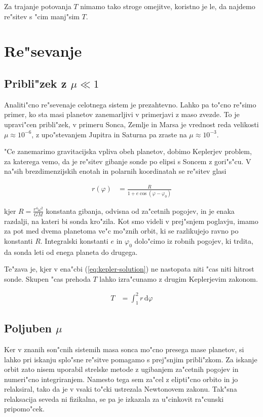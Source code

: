 \documentclass[a4paper,10pt]{article}
\renewcommand{\phi}{\varphi}
\newcommand{\dd}{\,\mathrm{d}}
\begin{document}
Za trajanje potovanja $T$ nimamo tako stroge omejitve, koristno je le, da najdemo re"sitev s "cim manj"sim $T$. 

\section{Re"sevanje}

\subsection{Pribli"zek z $\mu \ll 1$}

Analiti"cno re"sevenaje celotnega sistem je prezahtevno. Lahko pa to"cno re"simo primer, ko sta masi planetov zanemarljivi v primerjavi z maso zvezde. To je upravi"cen pribli"zek, v primeru Sonca, Zemlje in Marsa je vrednost reda velikosti $\mu \approx 10^{-6}$, z upo"stevanjem Jupitra in Saturna pa zraste na $\mu \approx 10^{-3}$. 

"Ce zanemarimo gravitacijska vpliva obeh planetov, dobimo Keplerjev problem, za katerega vemo, da je re"sitev gibanje sonde po elipsi s Soncem z gori"s"cu. V na"sih brezdimenzijskih enotah in polarnih koordinatah se re"sitev glasi

\begin{align}
\label{eq:kepler-solution}
 r(\phi) &= \frac{R}{1 + e\cos (\phi - \phi_0)}
\end{align}

kjer $R = \frac{r^4\omega^2}{GM}$ konstanta gibanja, odvisna od za"cetnih pogojev, in je enaka razdalji, na kateri bi sonda kro"zila. Kot smo videli v prej"snjem poglavju, imamo za pot med dvema planetoma ve"c mo"znih orbit, ki se razlikujejo ravno po konstanti $R$. Integralski konstanti $e$ in $\phi_0$ dolo"cimo iz robnih pogojev, ki trdita, da sonda leti od enega planeta do drugega.

Te"zava je, kjer v ena"cbi (\ref{eq:kepler-solution}) ne nastopata niti "cas niti hitrost sonde. Skupen "cas prehoda $T$ lahko izra"cunamo z drugim Keplerjevim zakonom. 

\begin{align}
 T &= \int_1^2 r \dd \phi
\end{align}

\subsection{Poljuben $\mu$}

Ker v znanih son"cnih sistemih masa sonca mo"cno presega mase planetov, si lahko pri iskanju splo"sne re"sitve pomagamo s prej"snjim pribli"zkom. Za iskanje orbit zato nisem uporabil strelske metode z ugibanjem za"cetnih pogojev in numeri"cno integriranjem. Namesto tega sem za"cel z elipti"cno orbito in jo relaksiral, tako da je v vsaki to"cki ustrezala Newtonovem zakonu. Tak"sna relaksacija seveda ni fizikalna, se pa je izkazala za u"cinkovit ra"cunski pripomo"cek. 
\end{document}
